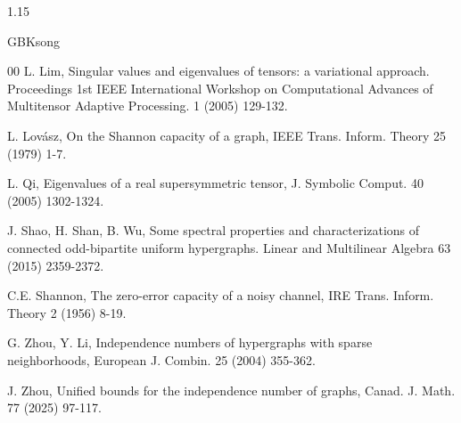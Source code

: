\documentclass[preprint,12pt]{elsarticle}
\begin{document}
\begin{spacing}{1.15}
\begin{CJK*}{GBK}{song}
\begin{thebibliography}{00}
L. Lim, Singular values and eigenvalues of tensors: a variational approach. Proceedings 1st IEEE International Workshop on Computational Advances of Multitensor Adaptive Processing. 1 (2005) 129-132.

L. Lov\'{a}sz, On the Shannon capacity of a graph, IEEE Trans. Inform. Theory 25 (1979) 1-7.

L. Qi, Eigenvalues of a real supersymmetric tensor, J. Symbolic Comput. 40 (2005) 1302-1324.

J. Shao, H. Shan, B. Wu, Some spectral properties and characterizations of connected odd-bipartite uniform hypergraphs. Linear and Multilinear Algebra 63 (2015) 2359-2372.

C.E. Shannon, The zero-error capacity of a noisy channel, IRE Trans. Inform. Theory 2 (1956) 8-19.

G. Zhou, Y. Li, Independence numbers of hypergraphs with sparse neighborhoods, European J. Combin. 25 (2004) 355-362.

J. Zhou, Unified bounds for the independence number of graphs, Canad. J. Math. 77 (2025) 97-117.
\end{thebibliography}
\end{CJK*}
\end{spacing}
\end{document}
